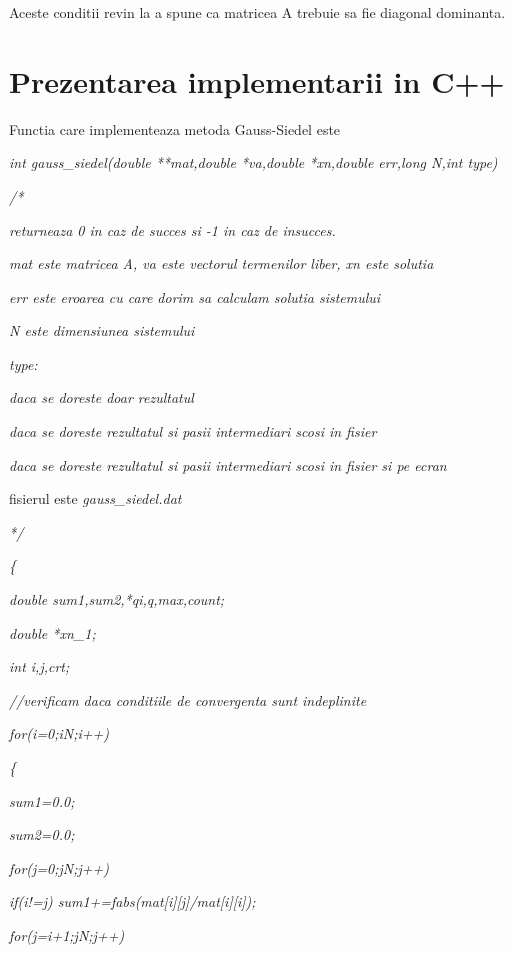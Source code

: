 \documentclass[a4paper,twoside]{book}
\begin{document}
Aceste conditii revin la a spune ca matricea A trebuie sa fie diagonal
dominanta.

\section{Prezentarea implementarii in C++}

Functia care implementeaza metoda Gauss-Siedel este

\textit{int gauss\_siedel(double **mat,double *va,double *xn,double err,long
N,int type)}

\textit{/*}

\textit{\qquad returneaza 0 in caz de succes si -1 in caz de insucces.}

\textit{\qquad mat este matricea A, va este vectorul termenilor liber, xn
este solutia}

\textit{\qquad err este eroarea cu care dorim sa calculam solutia sistemului}

\textit{\qquad N este dimensiunea sistemului}

\textit{\qquad type: }

\textit{ daca se doreste doar rezultatul}

\textit{ daca se doreste rezultatul si pasii intermediari scosi in
fisier}

\textit{ daca se doreste rezultatul si pasii intermediari scosi in
fisier si pe ecran}

\qquad fisierul este \textit{gauss\_siedel.dat }

\textit{*/}

\textit{\{}

\textit{\qquad double sum1,sum2,*qi,q,max,count;}

\textit{\qquad double *xn\_1;}

\textit{\qquad int i,j,crt;}

\textit{\qquad //verificam daca conditiile de convergenta sunt indeplinite}

\textit{\qquad for(i=0;i\TEXTsymbol{<}N;i++)}

\textit{\qquad \{}

\textit{\qquad \qquad sum1=0.0;}

\textit{\qquad \qquad sum2=0.0;}

\textit{\qquad \qquad for(j=0;j\TEXTsymbol{<}N;j++)}

\textit{\qquad \qquad \qquad if(i!=j) sum1+=fabs(mat[i][j]/mat[i][i]);}

\textit{\qquad \qquad for(j=i+1;j\TEXTsymbol{<}N;j++)}
\end{document}
